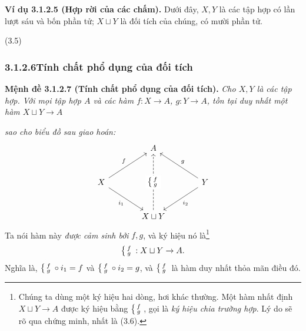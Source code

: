 \noindent\textbf{Ví dụ 3.1.2.5 (Hợp rời của các chấm).} Dưới đây, $X,Y$ là các tập hợp có lần lượt sáu và bốn phần tử; $X\sqcup Y$ là đối tích của chúng, có mười phần tử.
\begin{center}\hfill(3.5)\end{center}

\subsubsection*{3.1.2.6\quad Tính chất phổ dụng của đối tích}
\noindent\textbf{Mệnh đề 3.1.2.7 (Tính chất phổ dụng của đối tích).} \emph{Cho $X,Y$ là các tập hợp. Với mọi tập hợp $A$ và các hàm $f:X\to A$, $g:Y\to A$, tồn tại duy nhất một hàm $X\sqcup Y\to A$}

\emph{sao cho biểu đồ sau giao hoán:}
\[\begin{tikzcd}[column sep=large,row sep=large]
&A&\\ X\arrow[ur,"f"]\arrow[dr,"i_1"']&&Y\arrow[ul,"g"']\arrow[dl,"i_2"]\\
&X\sqcup Y\arrow[uu,dashed,"{\ctIIIcase{f}{g}}" description]&
\end{tikzcd}\]
Ta nói hàm này \emph{được cảm sinh bởi} $f,g$, và ký hiệu nó là\footnote{Chúng ta dùng một ký hiệu hai dòng, hơi khác thường. Một hàm nhất định $X\sqcup Y\to A$ được ký hiệu bằng $\left\{\begin{smallmatrix}f\\g\end{smallmatrix}\right.$, gọi là \emph{ký hiệu chia trường hợp}. Lý do sẽ rõ qua chứng minh, nhất là (3.6).}
\[\left\{\begin{smallmatrix}f\\g\end{smallmatrix}\right.:X\sqcup Y\to A.\]
Nghĩa là, $\left\{\begin{smallmatrix}f\\g\end{smallmatrix}\right.\circ i_1=f$ và $\left\{\begin{smallmatrix}f\\g\end{smallmatrix}\right.\circ i_2=g$, và $\left\{\begin{smallmatrix}f\\g\end{smallmatrix}\right.$ là hàm duy nhất thỏa mãn điều đó.

